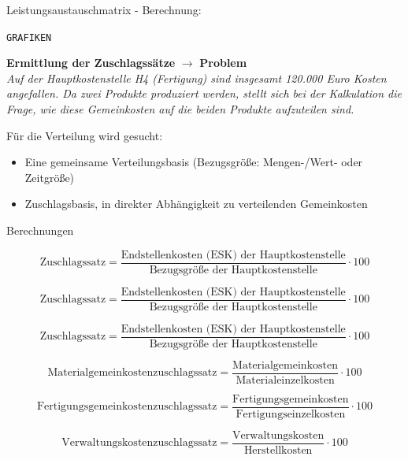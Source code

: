 \documentclass[a4paper,11pt, twoside]{article}
\begin{document}
Leistungsaustauschmatrix - Berechnung:

\texttt{GRAFIKEN}

\textbf{Ermittlung der Zuschlagssätze} $\rightarrow$ \textbf{Problem}\\
\textit{Auf der Hauptkostenstelle H4 (Fertigung) sind insgesamt 120.000 Euro Kosten angefallen. Da zwei Produkte produziert werden, stellt sich bei der Kalkulation die Frage, wie diese Gemeinkosten auf die beiden Produkte aufzuteilen sind.}

Für die Verteilung wird gesucht:
\begin{itemize}
	\item Eine gemeinsame Verteilungsbasis (Bezugsgröße: Mengen-/Wert- oder Zeitgröße)
	\item Zuschlagsbasis, in direkter Abhängigkeit zu verteilenden Gemeinkosten
\end{itemize}  

Berechnungen

\begin{equation}
\text{Zuschlagssatz} = \frac{\text{Endstellenkosten (ESK) der Hauptkostenstelle}}{\text{Bezugsgröße der Hauptkostenstelle}} \cdot 100
\end{equation}

\begin{equation}
\text{Zuschlagssatz} = \frac{\text{Endstellenkosten (ESK) der Hauptkostenstelle}}{\text{Bezugsgröße der Hauptkostenstelle}} \cdot 100
\end{equation}

\begin{equation}
\text{Zuschlagssatz} = \frac{\text{Endstellenkosten (ESK) der Hauptkostenstelle}}{\text{Bezugsgröße der Hauptkostenstelle}} \cdot 100
\end{equation}

\begin{equation}
\text{Materialgemeinkostenzuschlagssatz} = \frac{\text{Materialgemeinkosten}}{\text{Materialeinzelkosten}} \cdot 100
\end{equation}

\begin{equation}
\text{Fertigungsgemeinkostenzuschlagssatz} = \frac{\text{Fertigungsgemeinkosten}}{\text{Fertigungseinzelkosten}} \cdot 100
\end{equation}

\begin{equation}
\text{Verwaltungskostenzuschlagssatz} = \frac{\text{Verwaltungskosten}}{\text{Herstellkosten}} \cdot 100
\end{equation}
\end{document}
